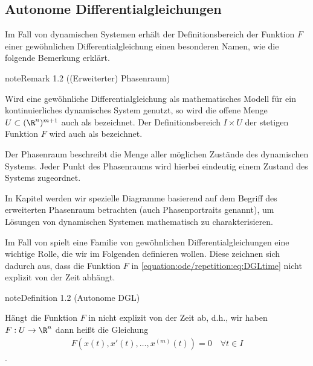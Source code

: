 \documentclass[letterpaper,10pt,english]{jupyterBook}
\begin{document}
\subsection{Autonome Differentialgleichungen}
\label{\detokenize{ode/repetition:autonome-differentialgleichungen}}
\sphinxAtStartPar
Im Fall von dynamischen Systemen erhält der Definitionsbereich der Funktion \(F\) einer gewöhnlichen Differentialgleichung einen besonderen Namen, wie die folgende Bemerkung erklärt.
\label{ode/repetition:remark-2}
\begin{sphinxadmonition}{note}{Remark 1.2 ((Erweiterter) Phasenraum)}



\sphinxAtStartPar
Wird eine gewöhnliche Differentialgleichung als mathematisches Modell für ein kontinuierliches dynamisches System genutzt, so wird die offene Menge \(U\subset (\R^n)^{m+1}\) auch als  bezeichnet.
Der Definitionsbereich \(I\times U\) der stetigen Funktion \(F\) wird auch als  bezeichnet.

\sphinxAtStartPar
Der Phasenraum beschreibt die Menge aller möglichen Zustände des dynamischen Systems.
Jeder Punkt des Phasenraums wird hierbei eindeutig einem Zustand des Systems zugeordnet.

\sphinxAtStartPar
In Kapitel {\hyperref[\detokenize{ode/fluesse:s-fluesse}]{}} werden wir spezielle Diagramme basierend auf dem Begriff des erweiterten Phasenraum betrachten (auch Phasenportraits genannt), um Lösungen von dynamischen Systemen mathematisch zu charakterisieren.
\end{sphinxadmonition}

\sphinxAtStartPar
Im Fall von  spielt eine Familie von gewöhnlichen Differentialgleichungen eine wichtige Rolle, die wir im Folgenden definieren wollen.
Diese zeichnen sich dadurch aus, dass die Funktion \(F\) in \eqref{equation:ode/repetition:eq:DGLtime} nicht explizit von der Zeit abhängt.
\label{ode/repetition:definition-3}
\begin{sphinxadmonition}{note}{Definition 1.2 (Autonome DGL)}



\sphinxAtStartPar
Hängt die Funktion \(F\) in {\hyperref[\detokenize{ode/repetition:def:DGL}]{}} nicht explizit von der Zeit ab, d.h., wir haben \(F:U\rightarrow\R^n\) dann heißt die Gleichung
\begin{equation}\label{equation:ode/repetition:eq:autonomeDGL}
\begin{split}F(x(t), x'(t), \ldots, x^{(m)}(t)) = 0 \quad \forall t\in I\end{split}
\end{equation}
\sphinxAtStartPar
{}.
\end{sphinxadmonition}
\end{document}
